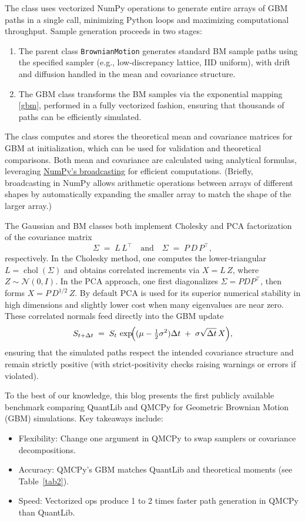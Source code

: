 \documentclass{article}
\begin{document}
The class uses vectorized NumPy operations to generate entire arrays of GBM paths in a single call, minimizing Python loops and maximizing computational throughput. Sample generation proceeds in two stages:
\begin{enumerate}
\item 
The parent class \texttt{BrownianMotion} generates standard BM sample paths using the specified sampler (e.g., low-discrepancy lattice, IID uniform), with drift and diffusion handled in the mean and covariance structure.
\item  The GBM class transforms the BM samples via the exponential mapping \eqref{gbm}, performed in a fully vectorized fashion, ensuring that thousands of paths can be efficiently simulated.
\end{enumerate}
The class computes and stores the theoretical mean and covariance matrices for GBM at initialization, which can be used for validation and theoretical comparisons. Both mean and covariance are calculated using analytical formulas, leveraging \href{https://numpy.org/devdocs/user/basics.broadcasting.html}{NumPy’s broadcasting} for efficient computations. (Briefly, broadcasting in NumPy allows arithmetic operations between arrays of different shapes by automatically expanding the smaller array to match the shape of the larger array.)

 The Gaussian and BM classes both implement Cholesky and PCA factorization of the covariance matrix
\[
\Sigma \;=\; L\,L^{\!\top}
\quad\text{and}\quad
\Sigma \;=\; P\,D\,P^{\!\top},
\]
respectively.  In the Cholesky method, one computes the lower‐triangular $L=\operatorname{chol}(\Sigma)$ and obtains correlated increments via $X=L\,Z$, where $Z\sim\mathcal{N}(0,I)$.  In the PCA approach, one first diagonalizes $\Sigma=PDP^{\!\top}$, then forms $X = P\,D^{1/2}\,Z$.  By default PCA is used for its superior numerical stability in high dimensions and slightly lower cost when many eigenvalues are near zero.  These correlated normals feed directly into the GBM update
\[
S_{t+\Delta t} \;=\; S_t\,\exp\!\Bigl((\mu - \tfrac12\sigma^2)\Delta t \;+\;\sigma\sqrt{\Delta t}\,X\Bigr),
\]
ensuring that the simulated paths respect the intended covariance structure and remain strictly positive (with strict‐positivity checks raising warnings or errors if violated).

\bigskip
\begin{tcolorbox}[title=Takeaways,colback=blue!1,colframe=blue!30!black]
To the best of our knowledge, this blog presents the first publicly available benchmark comparing QuantLib and QMCPy for Geometric Brownian Motion (GBM) simulations. Key takeaways include:
\begin{itemize}%
    \item Flexibility: Change one argument in QMCPy to swap samplers or covariance decompositions.
    \item Accuracy: QMCPy's GBM matches QuantLib and theoretical moments (see Table~\ref{tab2}).
    \item Speed: Vectorized ops produce 1 to 2 times faster path generation in QMCPy than QuantLib.
\end{itemize}
\end{tcolorbox}
\end{document}
